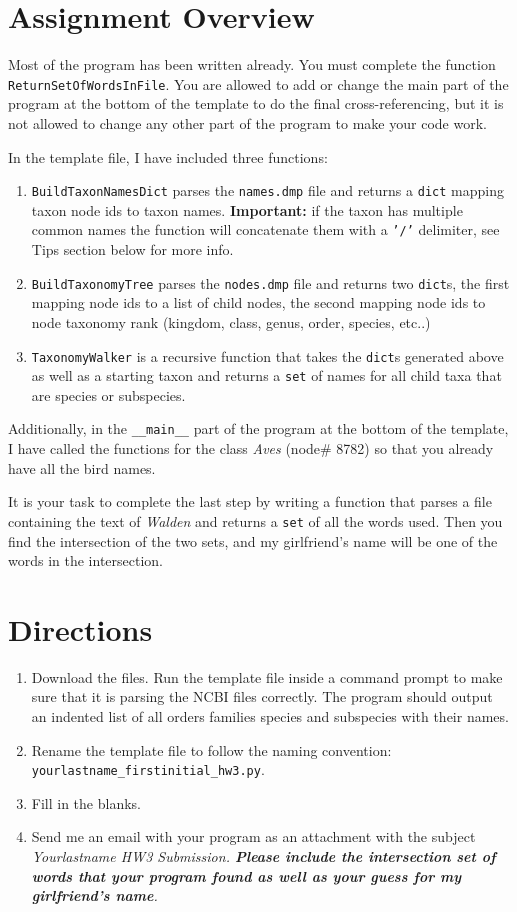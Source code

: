 \documentclass[11pt]{amsart}
\begin{document}
\section*{Assignment Overview}
Most of the program has been written already. You must complete the function \\ \texttt{ReturnSetOfWordsInFile}. You are allowed to add or change the main part of the program at the bottom of the template to do the final cross-referencing, but it is not allowed to change any other part of the program to make your code work.

In the template file, I have included three functions:
\begin{enumerate}
	\item \texttt{BuildTaxonNamesDict} parses the \texttt{names.dmp} file and returns a \texttt{dict} mapping taxon node ids to taxon names. \textbf{Important:} if the taxon has multiple common names the function will concatenate them with a \texttt{'/'} delimiter, see Tips section below for more info.
	\item \texttt{BuildTaxonomyTree} parses the \texttt{nodes.dmp} file and returns two \texttt{dict}s, the first mapping node ids to a list of child nodes, the second mapping node ids to node taxonomy rank (kingdom, class, genus, order, species, etc..)
	\item \texttt{TaxonomyWalker} is a recursive function that takes the \texttt{dict}s generated above as well as a starting taxon and returns a \texttt{set} of names for all child taxa that are species or subspecies.
\end{enumerate}
Additionally, in the \texttt{__main__} part of the program at the bottom of the template, I have called the functions for the class \textit{Aves} (node\# 8782) so that you already have all the bird names.

It is your task to complete the last step by writing a function that parses a file containing the text of \textit{Walden} and returns a \texttt{set} of all the words used. Then you find the intersection of the two sets, and my girlfriend's name will be one of the words in the intersection.

\section*{Directions}
\begin{enumerate}
	\item Download the files. Run the template file inside a command prompt to make sure that it is parsing the NCBI files correctly. The program should output an indented list of all orders families species and subspecies with their names.
	\item Rename the template file to follow the naming convention: \\ \texttt{yourlastname_firstinitial_hw3.py}.
	\item Fill in the blanks.
	\item Send me an email with your program as an attachment with the subject \em{Yourlastname HW3 Submission}. \textbf{Please include the intersection set of words that your program found as well as your guess for my girlfriend's name}.
\end{enumerate}
\end{document}
